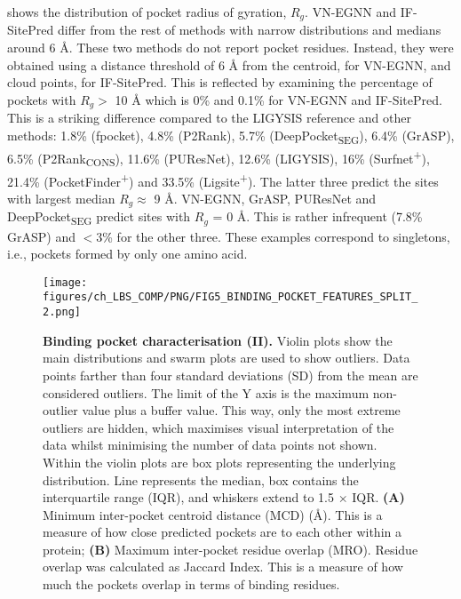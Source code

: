 shows the distribution of pocket radius of gyration, $R_{g}$. VN-EGNN and IF-SitePred differ from the rest of methods with narrow distributions and medians around 6 \AA{}. These two methods do not report pocket residues. Instead, they were obtained using a distance threshold of 6 \AA{} from the centroid, for VN-EGNN, and cloud points, for IF-SitePred. This is reflected by examining the percentage of pockets with $R_{g} >$ 10 \AA{} which is 0\% and 0.1\% for VN-EGNN and IF-SitePred. This is a striking difference compared to the LIGYSIS reference and other methods: 1.8\% (fpocket), 4.8\% (P2Rank), 5.7\% (DeepPocket\textsubscript{SEG}), 6.4\% (GrASP), 6.5\% (P2Rank\textsubscript{CONS}), 11.6\% (PUResNet), 12.6\% (LIGYSIS), 16\% (Surfnet\textsuperscript{+}), 21.4\% (PocketFinder\textsuperscript{+}) and 33.5\% (Ligsite\textsuperscript{+}). The latter three predict the sites with largest median $R_{g} \approx$ 9 \AA{}. VN-EGNN, GrASP, PUResNet and DeepPocket\textsubscript{SEG} predict sites with $R_{g}$ = 0 \AA{}. This is rather infrequent (7.8\% GrASP) and $<$3\% for the other three. These examples correspond to singletons, i.e., pockets formed by only one amino acid.

\begin{figure}[ht!]
    \centering
    \texttt{[image: figures/ch\_LBS\_COMP/PNG/FIG5\_BINDING\_POCKET\_FEATURES\_SPLIT\_2.png]}
    \caption[Binding pocket characterisation (II)]{\textbf{Binding pocket characterisation (II).} Violin plots show the main distributions and swarm plots are used to show outliers. Data points farther than four standard deviations (SD) from the mean are considered outliers. The limit of the Y axis is the maximum non-outlier value plus a buffer value. This way, only the most extreme outliers are hidden, which maximises visual interpretation of the data whilst minimising the number of data points not shown. Within the violin plots are box plots representing the underlying distribution. Line represents the median, box contains the interquartile range (IQR), and whiskers extend to 1.5 $\times$ IQR. \textbf{(A)} Minimum inter-pocket centroid distance (MCD) (\AA{}). This is a measure of how close predicted pockets are to each other within a protein; \textbf{(B)} Maximum inter-pocket residue overlap (MRO). Residue overlap was calculated as Jaccard Index. This is a measure of how much the pockets overlap in terms of binding residues.}
    \label{fig:pocket_features_2}
\end{figure}

